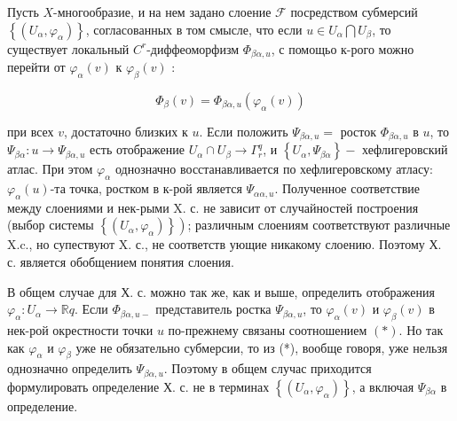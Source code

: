 \documentclass[10pt]{article}
\begin{document}
Пусть $X$-многообразие, и на нем задано слоение $\mathscr{F}$ посредством субмерсий $\left\{\left(U_{\alpha}, \varphi_{\alpha}\right)\right\}$, согласованных в том смысле, что если $u \in U_{\alpha} \bigcap U_{\beta}$, то существует локальный $C^{r}$-диффеоморфизм $\Phi_{\beta \alpha, u}$, с помощьо к-рого можно перейти от $\varphi_{\alpha}(v)$ к $\varphi_{\beta}(v)$ :



\[

\Phi_{\beta}(v)=\Phi_{\beta \alpha, u}\left(\varphi_{\alpha}(v)\right)

\]



при всех $v$, достаточно близких к $u$. Если положить $\Psi_{\beta \alpha, u}=$ росток $\Phi_{\beta \alpha, u}$ в $u$, то $\Psi_{\beta \alpha}: u \longrightarrow \Psi_{\beta \alpha, u}$ есть отображение $U_{\alpha} \cap U_{\beta} \longrightarrow \Gamma_{r}^{q}$, и $\left\{U_{\alpha}, \Psi_{\beta \alpha}\right\}-$ хефлигеровский атлас. При этом $\varphi_{\alpha}$ однозначно восстанавливается по хефлигеровскому атласу: $\varphi_{\alpha}(u)$-та точка, ростком в к-рой является $\Psi_{\alpha \alpha, u}$. Полученное соответствие между слоениями и нек-рыми $\mathrm{X}$. с. не зависит от случайностей построения (выбор системы $\left.\left\{\left(U_{\alpha}, \varphi_{\alpha}\right)\right\}\right)$; различным слоениям соответствуют различные X.c., но супествуют X. с., не соответств ующие никакому слоению. Поэтому Х. с. является обобщением понятия слоения.



В общем случае для Х. с. можно так же, как и выше, определить отображения $\varphi_{\alpha}: U_{\alpha} \rightarrow \mathbb{R} q$. Если $\Phi_{\beta \alpha, u-}$ представитель ростка $\Psi_{\beta \alpha, u}$, то $\varphi_{\alpha}(v)$ и $\varphi_{\beta}(v)$ в нек-рой окрестности точки $u$ по-прежнему связаны соотношением $(*)$. Но так как $\varphi_{\alpha}$ и $\varphi_{\beta}$ уже не обязательно субмерсии, то из (*), вообще говоря, уже нельзя однозначно определить $\Psi_{\beta \alpha, u}$. Поэтому в общем случас приходится формулировать определение Х. с. не в терминах $\left\{\left(U_{\alpha}, \varphi_{\alpha}\right)\right\}$, а включая $\Psi_{\beta \alpha}$ в определение.
\end{document}
